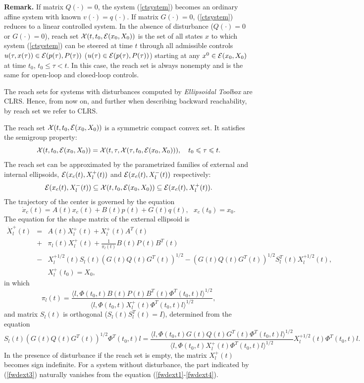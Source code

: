 \documentclass{report}
\newcommand{\EE}{{\cal E}}
\newcommand{\XX}{{\cal X}}
\begin{document}
{\bf Remark.} If matrix $Q(\cdot)=0$, the system (\ref{ctsystem})
becomes an ordinary affine system with known $v(\cdot)=q(\cdot)$.
If matrix $G(\cdot)=0$, (\ref{ctsystem}) reduces to a linear controlled system.
In the absence of disturbance ($Q(\cdot)=0$ or $G(\cdot)=0$), reach set
$\XX(t,t_0,\EE(x_0,X_0))$ is the set of all states $x$
to which system (\ref{ctsystem}) can be steered at time $t$ through all
admissible controls $u(\tau,x(\tau))\in\EE(p(\tau),P(\tau))$
($u(\tau)\in\EE(p(\tau),P(\tau))$) starting at any $x^0\in\EE(x_0,X_0)$ at time
$t_0$, $t_0\leq\tau<t$.
In this case, the reach set is always nonempty and
is the same for open-loop and closed-loop controls.

The reach sets for systems with disturbances computed by {\it Ellipsoidal
Toolbox} are CLRS.
Hence, from now on, and further when describing backward reachability,
by reach set we refer to CLRS.

The reach set $\XX(t,t_0,\EE(x_0,X_0))$ is a symmetric compact convex set.
It satisfies the semigroup property:
\[ \XX(t,t_0,\EE(x_0,X_0)) = \XX(t, \tau, \XX(\tau, t_0, \EE(x_0, X_0))),
~~~ t_0\leq\tau\leq t. \]
The reach set can be approximated by the parametrized families of external
and internal ellipsoids, $\EE(x_c(t),X^+_l(t))$ and $\EE(x_c(t),X^-_l(t))$
respectively:
\[ \EE(x_c(t), X^-_l(t))\subseteq\XX(t,t_0,\EE(x_0,X_0))
\subseteq \EE(x_c(t), X^+_l(t)). \]
The trajectory of the center is governed by the equation
\begin{equation}
\dot{x}_c(t) = A(t)x_c(t) + B(t)p(t) + G(t)q(t), ~~~
x_c(t_0)=x_0. \label{fwdcenter}
\end{equation}
The equation for the shape matrix of the external ellipsoid is
\begin{eqnarray}
\dot{X}^+_l(t) & = & A(t)X^+_l(t) + X^+_l(t)A^T(t) \label{fwdext1} \\
& + & \pi_l(t)X^+_l(t) + \frac{1}{\pi_l(t)}B(t)P(t)B^T(t) \label{fwdext2} \\
& - & X_l^{+1/2}(t)S_l(t)(G(t)Q(t)G^T(t))^{1/2} -
(G(t)Q(t)G^T(t))^{1/2}S_l^T(t)X_l^{+1/2}(t), \label{fwdext3} \\
& & X^+_l(t_0) = X_0, \label{fwdext4}
\end{eqnarray}
in which
\[ \pi_l(t) = \frac{\langle l,
\Phi(t_0,t)B(t)P(t)B^T(t)\Phi^T(t_0,t)l\rangle^{1/2}}{\langle l,
\Phi(t_0,t)X^+_l(t)\Phi^T(t_0,t)l\rangle^{1/2}}, \]
and matrix $S_l(t)$ is orthogonal ($S_l(t)S_l^T(t) = I$), determined
from the equation
\[ S_l(t)(G(t)Q(t)G^T(t))^{1/2}\Phi^T(t_0,t)l = \frac{\langle l,
\Phi(t_0,t)G(t)Q(t)G^T(t)\Phi^T(t_0,t)l\rangle^{1/2}}{\langle l,
\Phi(t_0,t)X_l^+(t)\Phi^T(t_0,t)l\rangle^{1/2}}X_l^{+1/2}(t)\Phi^T(t_0,t)l. \]
In the presence of disturbance if the reach set is empty, the
matrix $X^+_l(t)$ becomes sign indefinite.
For a system without disturbance, the part indicated by (\ref{fwdext3}) naturally vanishes
from the equation (\ref{fwdext1}-\ref{fwdext4}).
\end{document}
